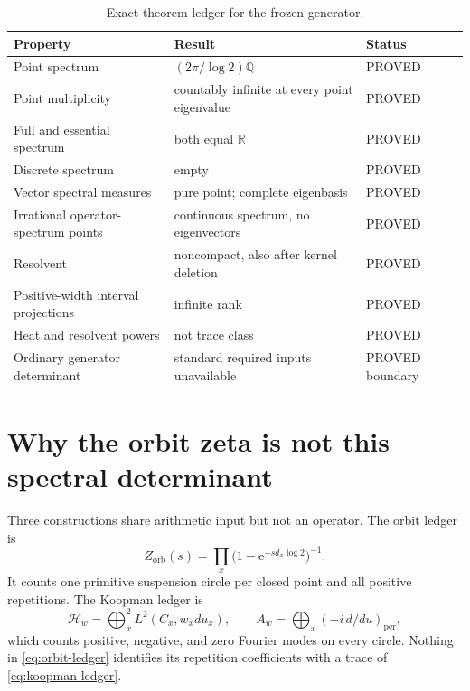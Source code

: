 \documentclass[11pt]{article}
\theoremstyle{definition}
\theoremstyle{remark}
\newcommand{\R}{\mathbb{R}}
\newcommand{\Q}{\mathbb{Q}}
\newcommand{\Hh}{\mathcal{H}}
\newcommand{\e}{\mathrm{e}}
\newcommand{\proved}{\textsf{PROVED}\xspace}
\begin{document}
\begin{table}[t]
\centering
\caption{Exact theorem ledger for the frozen generator.}
\label{tab:theorem-ledger}
\small
\begin{tabularx}{\textwidth}{@{}p{}Yp{0.18\textwidth}@{}}
\toprule
Property & Result & Status\\
\midrule
Point spectrum & \((2\pi/\log2)\Q\) & \proved\\
Point multiplicity & countably infinite at every point eigenvalue & \proved\\
Full and essential spectrum & both equal \(\R\) & \proved\\
Discrete spectrum & empty & \proved\\
Vector spectral measures & pure point; complete eigenbasis & \proved\\
Irrational operator-spectrum points & continuous spectrum, no eigenvectors & \proved\\
Resolvent & noncompact, also after kernel deletion & \proved\\
Positive-width interval projections & infinite rank & \proved\\
Heat and resolvent powers & not trace class & \proved\\
Ordinary generator determinant & standard required inputs unavailable & \proved boundary\\
\bottomrule
\end{tabularx}
\end{table}

\section{Why the orbit zeta is not this spectral determinant}
\label{sec:ledgers}

Three constructions share arithmetic input but not an operator.  The orbit
ledger is
\begin{equation}
 Z_{\mathrm{orb}}(s)
 =\prod_x\bigl(1-\e^{-s d_x\log2}\bigr)^{-1}.
 \label{eq:orbit-ledger}
\end{equation}
It counts one primitive suspension circle per closed point and all positive
repetitions.  The Koopman ledger is
\begin{equation}
 \Hh_w=\bigoplus_x^2L^2(C_x,w_xdu_x),
 \qquad
 A_w=\bigoplus_x(-i\,d/du)_{\mathrm{per}},
 \label{eq:koopman-ledger}
\end{equation}
which counts positive, negative, and zero Fourier modes on every circle.
Nothing in \eqref{eq:orbit-ledger} identifies its repetition coefficients
with a trace of \eqref{eq:koopman-ledger}.
\end{document}
